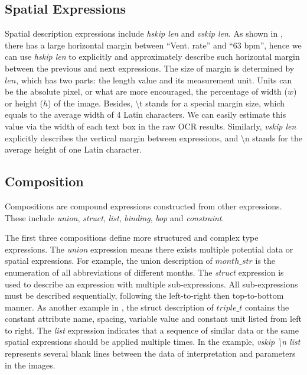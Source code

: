 \subsection{Spatial Expressions}
Spatial description expressions include \textit{hskip len} and \textit{vskip len}.
As shown in , there has a large horizontal margin
between ``Vent. rate'' and ``63 bpm'', hence we can use \textit{hskip len} to
explicitly and approximately describe such horizontal margin
between the previous and next expressions.
The size of margin is determined by $len$, which has two parts:
the length value and its measurement unit.
Units can be the absolute pixel, or what are more encouraged,
the percentage of width ($w$) or height ($h$) of the image.
Besides, \textbackslash t stands for a special margin size,
which equals to the average width of 4 Latin characters.
We can easily estimate this value via the width of each text box
in the raw OCR results.
Similarly, \textit{vskip len} explicitly describes the vertical margin
between expressions, and \textbackslash n stands for the average height
of one Latin character.

\subsection{Composition}
Compositions are compound expressions constructed from other expressions.
These include \textit{union}, \textit{struct}, \textit{list}, \textit{binding}, \textit{bop} and \textit{constraint}.

The first three compositions define more structured and
complex type expressions.
The \textit{union} expression means there exists
multiple potential data or spatial expressions.
For example, the union description of $month\_str$ is the enumeration
of all abbreviations of different months.
The \textit{struct} expression is used to describe
an expression with multiple sub-expressions.
All sub-expressions must be described sequentially,
following the left-to-right then top-to-bottom manner.
As another example in ,
the struct description of $triple\_t$ contains
the constant attribute name, spacing,
variable value and constant unit listed from left to right.
The \textit{list} expression indicates that a sequence of similar data or
the same spatial expressions should be applied multiple times.
In the example, \textit{vskip \textbackslash n list} represents several
blank lines between the data of interpretation and parameters in the images.

